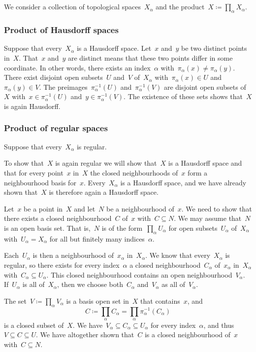 \subsection{}

We consider a collection of topological spaces~$X_α$ and the product~$X ≔ ∏_α X_α$.



\subsubsection*{Product of Hausdorff spaces}

Suppose that every~$X_α$ is a Hausdorff space.
Let~$x$ and~$y$ be two distinct points in~$X$.
That~$x$ and~$y$ are distinct means that these two points differ in some coordinate.
In other words, there exists an index~$α$ with~$π_α(x) ≠ π_α(y)$.
There exist disjoint open subsets~$U$ and~$V$ of~$X_α$ with~$π_α(x) ∈ U$ and~$π_α(y) ∈ V$.
The preimages~$π_α^{-1}(U)$ and~$π_α^{-1}(V)$ are disjoint open subsets of~$X$ with~$x ∈ π_α^{-1}(U)$ and~$y ∈ π_α^{-1}(V)$.
The existence of these sets shows that~$X$ is again Hausdorff.



\subsubsection*{Product of regular spaces}

Suppose that every~$X_α$ is regular.

To show that~$X$ is again regular we will show that~$X$ is a Hausdorff space and that for every point~$x$ in~$X$ the closed neighbourhoods of~$x$ form a neighbourhood basis for~$x$.
Every~$X_α$ is a Hausdorff space, and we have already shown that~$X$ is therefore again a Hausdorff space.

Let~$x$ be a point in~$X$ and let~$N$ be a neighbourhood of~$x$.
We need to show that there exists a closed neighbourhood~$C$ of~$x$ with~$C ⊆ N$.
We may assume that~$N$ is an open basis set.
That is,~$N$ is of the form~$∏_α U_α$ for open subsets~$U_α$ of~$X_α$ with~$U_α = X_α$ for all but finitely many indices~$α$.

Each~$U_α$ is then a neighbourhood of~$x_α$ in~$X_α$.
We know that every~$X_α$ is regular, so there exists for every index~$α$ a closed neighbourhood~$C_α$ of~$x_α$ in~$X_α$ with~$C_α ⊆ U_α$.
This closed neighbourhood contains an open neighbourhood~$V_α$.
If~$U_α$ is all of~$X_α$, then we choose both~$C_α$ and~$V_α$ as all of~$V_α$.

The set~$V ≔ ∏_α V_α$ is a basis open set in~$X$ that contains~$x$, and
\[
	C
	≔
	∏_α C_α
	=
	∏_α π_α^{-1}(C_α)
\]
is a closed subset of~$X$.
We have~$V_α ⊆ C_α ⊆ U_α$ for every index~$α$, and thus~$V ⊆ C ⊆ U$.
We have altogether shown that~$C$ is a closed neighbourhood of~$x$ with~$C ⊆ N$.
